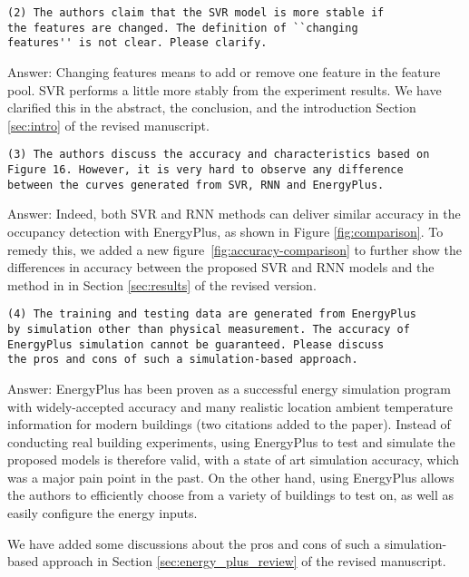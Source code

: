 \begin{verbatim}
(2) The authors claim that the SVR model is more stable if
the features are changed. The definition of ``changing
features'' is not clear. Please clarify.
\end{verbatim}

Answer: Changing features means to add or remove one feature in the
feature pool. SVR performs a little more stably from the experiment
results. We have clarified this in the abstract, the conclusion, and
the introduction Section \ref{sec:intro} of the revised manuscript.

\begin{verbatim}
(3) The authors discuss the accuracy and characteristics based on
Figure 16. However, it is very hard to observe any difference
between the curves generated from SVR, RNN and EnergyPlus.
\end{verbatim}

Answer: Indeed, both SVR and RNN methods can deliver similar accuracy
in the occupancy detection with EnergyPlus, as shown in Figure
\ref{fig:comparison}. To remedy this, we added a new figure~\ref{fig:accuracy-comparison}
to further show the differences in accuracy between the proposed SVR
and RNN models and the method in \cite{dong2014real} in Section
\ref{sec:results} of the revised version.

\begin{verbatim}
(4) The training and testing data are generated from EnergyPlus
by simulation other than physical measurement. The accuracy of
EnergyPlus simulation cannot be guaranteed. Please discuss
the pros and cons of such a simulation-based approach.
\end{verbatim}

Answer: EnergyPlus has been proven as a successful energy simulation
program with widely-accepted accuracy and many realistic location
ambient temperature information for modern buildings (two citations
added to the paper).  Instead of conducting real building experiments,
using EnergyPlus to test and simulate the proposed models is therefore
valid, with a state of art simulation accuracy, which was a major pain
point in the past. On the other hand, using EnergyPlus allows the
authors to efficiently choose from a variety of buildings to test on,
as well as easily configure the energy inputs.

We have added some discussions about the pros and cons of such a
simulation-based approach in Section \ref{sec:energy_plus_review} of
the revised manuscript.


